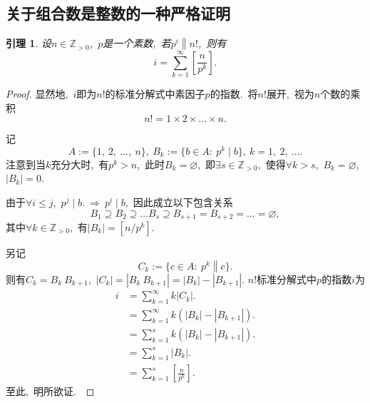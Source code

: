 \documentclass[UTF8, twoside]{ctexart}
\theoremstyle{nonumberplain}
\newtheorem{proof}{\heiti 证明}  %
\theoremstyle{nonumberplain}
\theoremstyle{plain}
\newtheorem{yinli}[dingyi]{引理}
\begin{document}
	\subsection{关于组合数是整数的一种严格证明}
	\label{贾宪数}
	\begin{yinli} \label{引理1.4}
		设$n \in \mathbb{Z}_{>0}$,\ $p$是一个素数,\ 若$\left. p^i \right\| n!$,\ 则有
		\[
		i = \sum_{k=1}^{\infty} \left[ \frac{n}{p^k} \right].
		\]
	\end{yinli}
		\begin{proof}
			显然地,\ $i$即为$n!$的标准分解式中素因子$p$的指数.\ 将$n!$展开,\ 视为$n$个数的乘积
			\[
				n! = 1 \times 2 \times \dots \times n.
			\]
			
			记
			\[
				A:=\{1,\ 2,\ \dots,\ n\},\ B_k:=\{b \in A:\ p^k\mid b\},\ k=1,\ 2,\ \dots.
			\]
			注意到当$k$充分大时,\ 有$p^k > n$,\ 此时$B_k = \varnothing$,\ 即$\exists s \in \mathbb{Z}_{>0}$,\ 
			使得$\forall k > s$,\ $B_k = \varnothing$,\ $\left| B_k \right| = 0$.
			
			由于$\forall i \le j$,\ $p^j \mid b. \ \Rightarrow\  p^i \mid b$,\ 因此成立以下包含关系
			\[
				B_1 \supseteq B_2 \supseteq \dots B_s \supseteq B_{s+1} = B_{s+2} = \dots =\varnothing,
			\]
			其中$\forall k \in \mathbb{Z}_{>0}$,\ 有$\left| B_k \right| = \left[ n / p^k \right]$.
			
			另记
			\[
				C_k:=\{c \in A:\ \left. p^k \right\| c\}.
			\]
			则有$C_k = B_k \ B_{k+1}$,\ $\left| C_k \right| = \left| B_k \ B_{k+1} \right| = \left| B_k \right| - \left| B_{k+1} \right|$. 
			$n!$标准分解式中$p$的指数$i$为
			\begin{align*}
				i &= \sum_{k=1}^{\infty} k \left| C_k \right|. \\
				&= \sum_{k=1}^{\infty} k \left( \left| B_k \right| - \left| B_{k+1} \right| \right). \\
				&= \sum_{k=1}^{s} k \left( \left| B_k \right| - \left| B_{k+1} \right| \right). \\
				&= \sum_{k=1}^{s} \left| B_k \right|. \\
				&= \sum_{k=1}^{s} \left[ \frac{n}{p^k} \right].
			\end{align*}
			至此,\ 明所欲证.\ 
		\end{proof}
	
\end{document}
